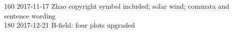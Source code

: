 \begin{footnotesize}
160	2017-11-17	Zhao copyright symbol included; solar wind; commata and sentence wording\\
180	2017-12-21	B-field: four plots upgraded\\

\end{footnotesize}
